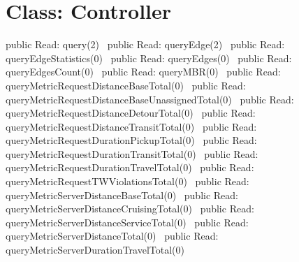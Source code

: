 \section*{Class: Controller}
\nwenddocs{}\endmoddef{}
public \LA{}Read: query(2)~{\nwtagstyle{}}\RA{}
public \LA{}Read: queryEdge(2)~{\nwtagstyle{}}\RA{}
public \LA{}Read: queryEdgeStatistics(0)~{\nwtagstyle{}}\RA{}
public \LA{}Read: queryEdges(0)~{\nwtagstyle{}}\RA{}
public \LA{}Read: queryEdgesCount(0)~{\nwtagstyle{}}\RA{}
public \LA{}Read: queryMBR(0)~{\nwtagstyle{}}\RA{}
public \LA{}Read: queryMetricRequestDistanceBaseTotal(0)~{\nwtagstyle{}}\RA{}
public \LA{}Read: queryMetricRequestDistanceBaseUnassignedTotal(0)~{\nwtagstyle{}}\RA{}
public \LA{}Read: queryMetricRequestDistanceDetourTotal(0)~{\nwtagstyle{}}\RA{}
public \LA{}Read: queryMetricRequestDistanceTransitTotal(0)~{\nwtagstyle{}}\RA{}
public \LA{}Read: queryMetricRequestDurationPickupTotal(0)~{\nwtagstyle{}}\RA{}
public \LA{}Read: queryMetricRequestDurationTransitTotal(0)~{\nwtagstyle{}}\RA{}
public \LA{}Read: queryMetricRequestDurationTravelTotal(0)~{\nwtagstyle{}}\RA{}
public \LA{}Read: queryMetricRequestTWViolationsTotal(0)~{\nwtagstyle{}}\RA{}
public \LA{}Read: queryMetricServerDistanceBaseTotal(0)~{\nwtagstyle{}}\RA{}
public \LA{}Read: queryMetricServerDistanceCruisingTotal(0)~{\nwtagstyle{}}\RA{}
public \LA{}Read: queryMetricServerDistanceServiceTotal(0)~{\nwtagstyle{}}\RA{}
public \LA{}Read: queryMetricServerDistanceTotal(0)~{\nwtagstyle{}}\RA{}
public \LA{}Read: queryMetricServerDurationTravelTotal(0)~{\nwtagstyle{}}\RA{}
